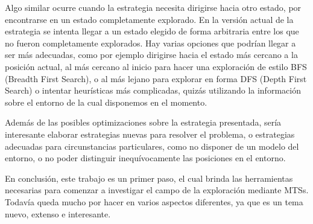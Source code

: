 \vspace{\baselineskip}
Algo similar ocurre cuando la estrategia necesita dirigirse hacia otro estado, por encontrarse en un estado completamente explorado.
En la versión actual de la estrategia se intenta llegar a un estado elegido de forma arbitraria entre los que no fueron completamente
explorados. Hay varias opciones que podrían llegar a ser más adecuadas, como por ejemplo dirigirse hacia el estado más cercano a la
posición actual, al más cercano al inicio para hacer una exploración de estilo BFS (Breadth First Search), o al más lejano para explorar
en forma DFS (Depth First Search) o intentar heurísticas más complicadas, quizás utilizando la información sobre el entorno de la cual
disponemos en el momento.

\vspace{\baselineskip}
Además de las posibles optimizaciones sobre la estrategia presentada, sería interesante elaborar estrategias nuevas para resolver el
problema, o estrategias adecuadas para circunstancias particulares, como no disponer de un modelo del entorno, o no poder distinguir
inequívocamente las posiciones en el entorno.

\vspace{\baselineskip}
En conclusión, este trabajo es un primer paso, el cual brinda las herramientas necesarias para comenzar a investigar el campo de la
exploración mediante MTSs. Todavía queda mucho por hacer en varios aspectos diferentes, ya que es un tema nuevo, extenso e interesante.